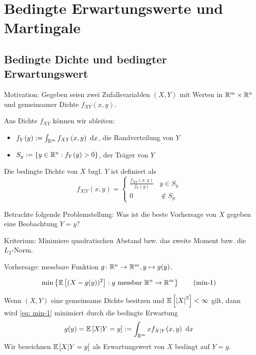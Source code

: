 \section{Bedingte Erwartungswerte und Martingale}

\subsection{Bedingte Dichte und bedingter Erwartungswert}

Motivation: Gegeben seien zwei Zufallsvariablen $(X,Y)$ mit Werten in $\mathbb{R}^m \times \mathbb{R}^n$ und gemeinsamer Dichte $f_{XY}(x,y)$.

Aus Dichte $f_{XY}$ können wir ableiten:
\begin{itemize}
	\item $f_Y(y) \mathrel{:=} \int_{\mathbb{R}^m} f_{XY}(x,y) \enskip \mathrm{d}x$, die Randverteilung von $Y$
	\item $S_y \mathrel{:=} \left\{ y \in \mathbb{R}^n : f_Y(y) > 0 \right\}$, der Träger von $Y$
\end{itemize}

\begin{definition}
	Die bedingte Dichte von $X$ bzgl. $Y$ ist definiert als
	\begin{equation*}
	f_{X|Y}(x,y) = \begin{cases}
	\frac{f_{XY}(x,y)}{f_Y(y)} & y \in S_y \\ 0 & \notin S_y
	\end{cases}
	\end{equation*}
\end{definition}

Betrachte folgende Problemstellung: Was ist die beste Vorhersage von $X$ gegeben eine Beobachtung $Y = y$?

Kriterium: Minimiere quadratischen Abstand bzw. das zweite Moment bzw. die $L_2$-Norm.

Vorhersage: messbare Funktion $\abb{g}{\Rn}{\R^m}, y \mapsto g(y)$.

\begin{equation}
\min\left\{ \mathbb{E} \left[ (X-g(y))^2 \right] : g \text{ messbar } \mathbb{R}^n \to \mathbb{R}^m \right\} \tag{min-1} \label{eq: min-1}
\end{equation}

\begin{proposition} %
	Wenn $(X,Y)$ eine gemeinsame Dichte besitzen und $\mathbb{E} \left[ \left| X \right|^2 \right] < \infty$ gilt, dann wird \eqref{eq: min-1} minimiert durch die bedingte Erwartung
	\begin{equation*}
	g(y) = \mathbb{E} \left[ X | Y=y \right] \mathrel{:=} \int_{\mathbb{R}^m} x f_{X | Y}(x,y) \enskip \mathrm{d}x
	\end{equation*}
	Wir bezeichnen $ \mathbb{E} \left[ X | Y=y \right]$ als Erwartungswert von $X$ bedingt auf $Y=y$.
\end{proposition}

